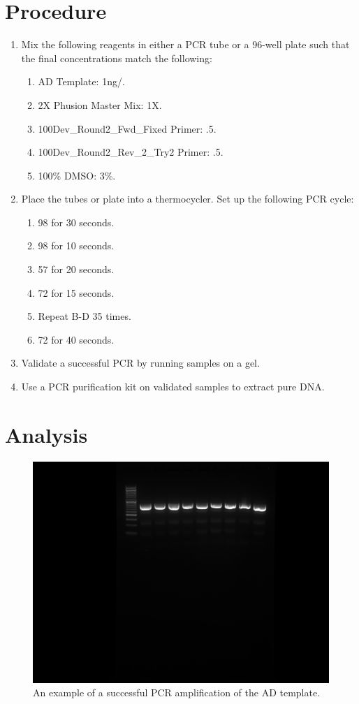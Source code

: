 \documentclass{ssiBio}
\begin{document}
\section{Procedure}
\begin{enumerate}
  \item{Mix the following reagents in either a PCR tube or a 96-well plate such that the final concentrations match the following:}
  \begin{enumerate}
    \item{AD Template: 1ng/\uL{}.}
    \item{2X Phusion Master Mix: 1X.}
    \item{100\uM \space Dev\_Round2\_Fwd\_Fixed Primer: .5\uM.}
    \item{100\uM \space Dev\_Round2\_Rev\_2\_Try2 Primer: .5\uM.}
    \item{100\% DMSO: 3\%.}
  \end{enumerate}
  \item{Place the tubes or plate into a thermocycler. Set up the following PCR cycle:}
  \begin{enumerate}
    \item{98\C{} for 30 seconds.}
    \item{98\C{} for 10 seconds.}
    \item{57\C{} for 20 seconds.}
    \item{72\C{} for 15 seconds.}
    \item{Repeat B-D 35 times.}
    \item{72\C{} for 40 seconds.}
  \end{enumerate}
  \item{Validate a successful PCR by running samples on a gel.}
  \item{Use a PCR purification kit on validated samples to extract pure DNA.}
\end{enumerate}

\section{Analysis}
\begin{figure}[ht]
  \centering
  \includegraphics[width=.5\linewidth]{images/gel.png}
  \caption{An example of a successful PCR amplification of the AD template.}
  \label{fig:gel1}
\end{figure}



\end{document}
